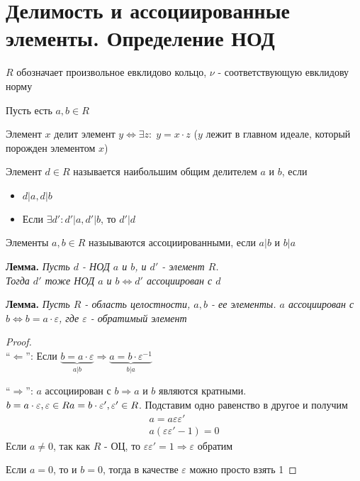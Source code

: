 
\section{Делимость и ассоциированные элементы. Определение НОД}
\begin{normalsize}
    $R$ обозначает произвольное евклидово кольцо, $\nu$ - соответствующую евклидову норму
    \begin{theorem-non}
        Пусть есть $a, b \in R$
        \begin{conj}
            Элемент $x$ делит элемент $y \Longleftrightarrow \exists z: \; y = x \cdot z$ ($y$ лежит в главном идеале, который порожден элементом $x$)
        \end{conj}
        \begin{conj}
            Элемент $d \in R$ называется наибольшим общим делителем $a$ и $b$, если \begin{itemize}
                \item $d | a, d | b$
                \item Если $\exists d' : d' | a, d' | b$, то $d' | d$
            \end{itemize}
        \end{conj}
    \end{theorem-non}
        \begin{conj}
            Элементы $a, b \in R$ назыываются ассоциированными, если $a|b$ и $b|a$
        \end{conj}
        \textbf{Лемма.}
        \textit{Пусть $d$ - НОД $a$ и $b$, и $d'$ - элемент $R$. \\
        Тогда $d'$ тоже НОД $a$ и $b \Longleftrightarrow d'$ ассоциирован с $d$}

        \textbf{Лемма.} 
        \textit{
            Пусть $R$ - область целостности, $a, b$ - ее элементы. $a$ ассоциирован с $b \Longleftrightarrow b = a \cdot \varepsilon$, 
            где $\varepsilon$ - обратимый элемент 
        } 
        \begin{proof} \quad \\
            ``$\Longleftarrow$'': Если $\underbrace{b = a \cdot \varepsilon}_{a | b} \Longrightarrow \underbrace{a = b \cdot \varepsilon^{-1}}_{b | a}$ 

            ``$\Longrightarrow$'': $a$ ассоциирован с $b \Longrightarrow a$ и $b$ являются кратными. $b = a \cdot \varepsilon, \varepsilon \in R \\
            a = b \cdot \varepsilon', \varepsilon' \in R$. Подставим одно равенство в другое и получим 
            \begin{gather*}
                a = a\varepsilon\varepsilon' \\
                a(\varepsilon\varepsilon' - 1) = 0
            \end{gather*}
            Если $a \neq 0$, так как $R$ - ОЦ, то $\varepsilon\varepsilon' = 1 \Longrightarrow \varepsilon$ обратим 
            
            Если $a = 0$, то и $b = 0$, тогда в качестве $\varepsilon$ можно просто взять 1
        \end{proof}
\end{normalsize}
